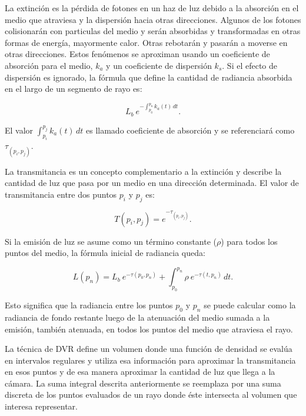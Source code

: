 \documentclass[oneside,a4paper,spanish,links]{amca}
\begin{document}
La extinción es la pérdida de fotones en un haz de luz debido a la
absorción en el medio que atraviesa y la dispersión hacia otras
direcciones. Algunos de los fotones colisionarán con particulas del
medio y serán absorbidas y transformadas en otras formas de energía,
mayormente calor. Otras rebotarán y pasarán a moverse en otras
direcciones. Estos fenómenos se aproximan usando un coeficiente de
absorción para el medio, $k_a$ y un coeficiente de dispersión
$k_s$. Si el efecto de dispersión es ignorado, la fórmula que define
la cantidad de radiancia absorbida en el largo de un segmento de rayo
es: 

\begin{equation} \label{eq:radiance_absorption}  
    L_b \ e^{- \textstyle  \int_{p_0}^{p_n} k_a(t) \, dt}.
\end{equation}

El valor $\int_{p_i}^{p_j} k_a(t) \, dt$ es llamado coeficiente de
absorción y se referenciar\'a como $\tau_{(p_i, p_j)}$.

La transmitancia es un concepto complementario a la extinción y
describe la cantidad de luz que pasa por un medio en una dirección
determinada. El valor de transmitancia entre dos puntos $p_i$ y $p_j$
es:

\begin{equation} \label{eq:general_radiance}  
  T(p_i,p_j) = e^{- \textstyle \tau_{(p_i, p_j)}}.
\end{equation}

Si la emisión de luz se asume como un término constante ($\rho$) para
todos los puntos del medio, la fórmula inicial de radiancia queda:

\begin{equation} \label{eq:ray_radiance}  
  L(p_n) = L_b \ e^{-\tau(p_0, p_n)} + \int_{p_0}^{p_n} \rho \ e^{-\tau(t,p_n)} \, dt.
\end{equation}

Esto significa que la radiancia entre los puntos $p_0$ y
$p_n$ se puede calcular como la radiancia de fondo restante luego de
la atenuación del medio sumada a la emisión, también atenuada, en todos
los puntos del medio que atraviesa el rayo.

La técnica de DVR define un volumen donde una función de densidad se
evalúa en intervalos regulares y utiliza esa información para
aproximar la transmitancia en esos puntos y de esa manera aproximar la
cantidad de luz que llega a la cámara. La suma integral descrita
anteriormente se reemplaza por una suma discreta de los puntos
evaluados de un rayo donde \'este intersecta al volumen que interesa
representar. 
\end{document}
